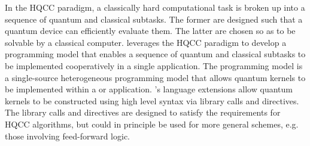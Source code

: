 In the \ac{HQCC} paradigm, a classically hard computational task is broken up into a sequence of quantum and classical subtasks. The former are designed such that a quantum device can efficiently evaluate them. The latter are chosen so as to be solvable by a classical computer. 
\qcor leverages the \ac{HQCC} paradigm to develop a programming model that enables a sequence of quantum and classical subtasks to be implemented cooperatively in a single application. The \qcor programming model is a single-source heterogeneous programming model that allows quantum kernels to be implemented within a \Clang or \Cpp application. \qcor's language extensions allow quantum kernels to be constructed using high level \CorCpp syntax via library calls and directives. The library calls and directives are designed to satisfy the requirements for \ac{HQCC} algorithms, but could in principle be used for more general schemes, e.g. those involving feed-forward logic. 
